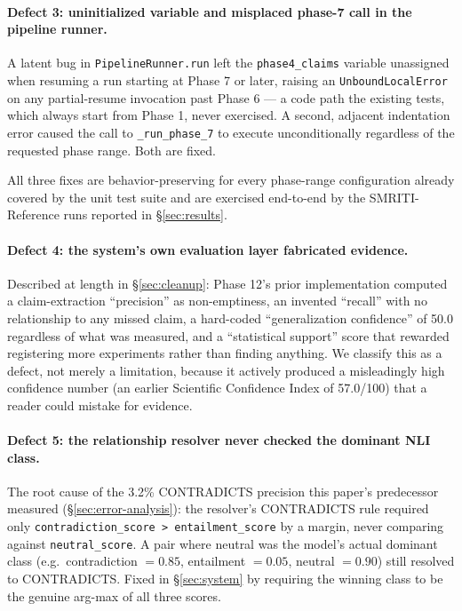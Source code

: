 \paragraph{Defect 3: uninitialized variable and misplaced phase-7 call in
the pipeline runner.} A latent bug in \texttt{PipelineRunner.run} left the
\texttt{phase4\_claims} variable unassigned when resuming a run starting
at Phase 7 or later, raising an \texttt{UnboundLocalError} on any
partial-resume invocation past Phase 6 --- a code path the existing tests,
which always start from Phase 1, never exercised. A second, adjacent
indentation error caused the call to \texttt{\_run\_phase\_7} to execute
unconditionally regardless of the requested phase range. Both are fixed.

All three fixes are behavior-preserving for every phase-range
configuration already covered by the unit test suite and are exercised
end-to-end by the SMRITI-Reference runs reported in \S\ref{sec:results}.

\paragraph{Defect 4: the system's own evaluation layer fabricated
evidence.} Described at length in \S\ref{sec:cleanup}: Phase 12's prior
implementation computed a claim-extraction ``precision'' as
non-emptiness, an invented ``recall'' with no relationship to any missed
claim, a hard-coded ``generalization confidence'' of 50.0 regardless of
what was measured, and a ``statistical support'' score that rewarded
registering more experiments rather than finding anything. We classify
this as a defect, not merely a limitation, because it actively produced a
misleadingly high confidence number (an earlier Scientific Confidence
Index of 57.0/100) that a reader could mistake for evidence.

\paragraph{Defect 5: the relationship resolver never checked the
dominant NLI class.} The root cause of the 3.2\% CONTRADICTS precision
this paper's predecessor measured (\S\ref{sec:error-analysis}): the
resolver's CONTRADICTS rule required only \texttt{contradiction\_score >
entailment\_score} by a margin, never comparing against
\texttt{neutral\_score}. A pair where neutral was the model's actual
dominant class (e.g.\ contradiction $=0.85$, entailment $=0.05$, neutral
$=0.90$) still resolved to CONTRADICTS. Fixed in \S\ref{sec:system} by
requiring the winning class to be the genuine arg-max of all three scores.

